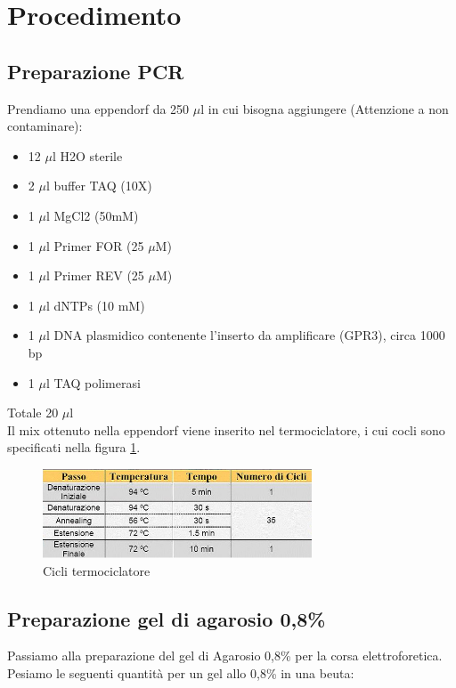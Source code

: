 \section{Procedimento}

\subsection{Preparazione PCR}

Prendiamo una eppendorf da 250 $\mu$l in cui bisogna aggiungere (Attenzione a non contaminare):
\begin{itemize}
	\item 12 $\mu$l H2O sterile
	\item 2 $\mu$l buffer TAQ (10X)
	\item 1 $\mu$l MgCl2 (50mM)
	\item 1 $\mu$l Primer FOR (25 $\mu$M)
	\item 1 $\mu$l Primer REV (25 $\mu$M)
	\item 1 $\mu$l dNTPs (10 mM)
	\item 1 $\mu$l DNA plasmidico contenente l’inserto da amplificare (GPR3), circa 1000 bp
	\item 1 $\mu$l TAQ polimerasi
\end{itemize}

Totale 20 $\mu$l\\

Il mix ottenuto nella eppendorf
viene inserito nel termociclatore, i cui cocli sono specificati nella figura \ref{cicli_termociclatore}.
\begin{figure}[htbp]
	\centering
	\includegraphics[width=80mm]{./immagini/cicli_termociclatore.jpg}
	\caption{Cicli termociclatore}
	\label{cicli_termociclatore}
\end{figure}

\subsection{Preparazione gel di agarosio 0,8\%}

Passiamo alla preparazione del gel di Agarosio 0,8\% per la corsa elettroforetica.
Pesiamo le seguenti quantità per un gel allo 0,8\% in una beuta:

